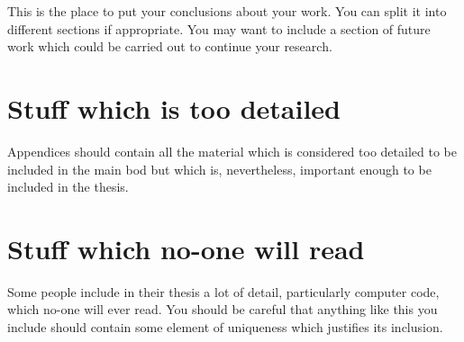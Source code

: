 \documentclass[12pt,a4paper]{report}
\begin{document}
This is the place to put your conclusions about your work. You can
split it into different sections if appropriate. You may want to include
a section of future work which could be carried out to continue your
research.

\appendix

\chapter{Stuff which is too detailed}

Appendices should contain all the material which is considered too
detailed to be included in the main bod but which is, nevertheless,
important enough to be included in the thesis.

\chapter{Stuff which no-one will read}

Some people include in their thesis a lot of detail, particularly
computer code, which no-one will ever read. You should be careful that
anything like this you include should contain some element of uniqueness
which justifies its inclusion.
\end{document}
